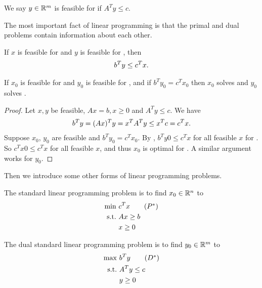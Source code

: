 \begin{definition}
We say $y \in \mathbb{R}^m$ is feasible for  if $A^T y\le c$.
\end{definition}

The most important fact of linear programming is that the primal and
dual problems contain information about each other.

\begin{theorem}
If $x$ is feasible for  and $y$ is feasible for , then 
\begin{align}
b^T y \le c^T x. \labeq{d_o}
\end{align}

If $x_0$ is feasible for  and $y_0$ is feasible for , and if $b^T y_0 = c^T x_0$ then $x_0$ solves  and $y_0$ solves .
\end{theorem}

\begin{proof}
Let $x, y$ be feasible, $Ax=b, x\ge0$ and $A^T y\le c$.
We have 
\begin{align}
b^T y = (Ax)^T y = x^T A^T y \le x^T c = c^T x. \labeq{proof_d_o}
\end{align}
Suppose $x_0$, $y_0$ are feasible and $b^T y_0 = c^T x_0$.
By , $b^T y0 \le c^T x$ for all feasible $x$ for .
So $c^T x0 \le c^T x$ for all feasible $x$, and thus $x_0$ is optimal for .
A similar argument works for $y_0$. 
\end{proof}

Then we introduce some other forms of linear programming problems.

\begin{definition}
The standard linear programming problem is to find $x_0 \in \mathbb{R}^n$ to
\begin{align}
\min \ & c^T x \tag{$P^*$} \labeq{LP_Ps} \\
\st & Ax \ge b \nonumber \\
    & x \ge 0 \nonumber
\end{align}
\end{definition}

\begin{definition}
The dual standard linear programming problem is to find $y_0 \in \mathbb{R}^m$ to
\begin{align}
\max \ & b^T y \tag{$D^*$} \labeq{LP_Ds} \\
\st & A^T y \le c \nonumber \\
    & y \ge 0 \nonumber
\end{align}
\end{definition}

